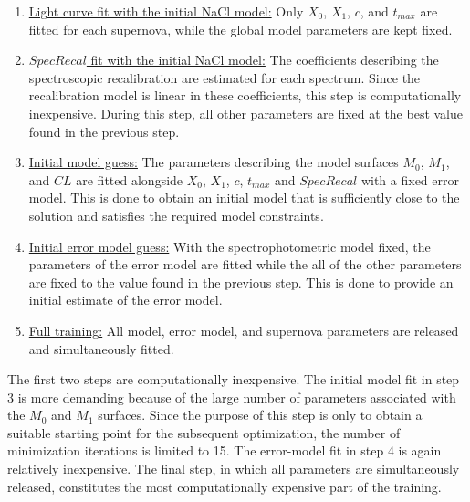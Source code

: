 \begin{enumerate}
    \item \underline{Light curve fit with the initial NaCl model:} 
    Only $X_0$, $X_1$, $c$, and $t_{max}$ are fitted for each 
    supernova, while the global model parameters are kept fixed.

    \item \underline{$SpecRecal$ fit with the initial NaCl model:} 
    The coefficients describing the spectroscopic recalibration are 
    estimated for each spectrum. Since the recalibration model is linear 
    in these coefficients, this step is computationally inexpensive. During this step, all other parameters are fixed at the best value found in the previous step. 

    \item \underline{Initial model guess:} 
    The parameters describing the model surfaces $M_0$, $M_1$, and $CL$ are 
    fitted alongside $X_0$, $X_1$, $c$, $t_{max}$ and $SpecRecal$ with a fixed error model. 
    This is done to obtain an initial model that is sufficiently close to the 
    solution and satisfies the required model constraints.

    \item \underline{Initial error model guess:} 
    With the spectrophotometric model fixed, the parameters of the error 
    model are fitted while the all of the other parameters are fixed to the value found in the previous step. 
    This is done to provide an initial estimate of the error model.

    \item \underline{Full training:} 
    All model, error model, and supernova parameters are released and 
    simultaneously fitted.
\end{enumerate}

The first two steps are computationally inexpensive. The initial model fit 
in step 3 is more demanding because of the large number of parameters 
associated with the $M_0$ and $M_1$ surfaces. Since the purpose of this step 
is only to obtain a suitable starting point for the subsequent optimization, 
the number of minimization iterations is limited to 15. The error-model fit 
in step 4 is again relatively inexpensive. The final step, in which all 
parameters are simultaneously released, constitutes the most computationally 
expensive part of the training.



